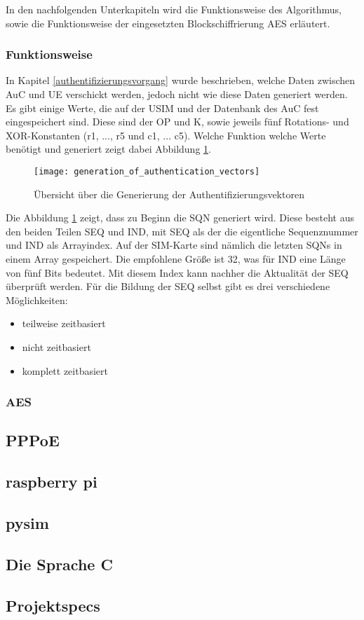 In den nachfolgenden Unterkapiteln wird die Funktionsweise des Algorithmus, sowie die Funktionsweise der eingesetzten Blockschiffrierung \ac{AES} erläutert.

 \subsubsection{Funktionsweise}
 In Kapitel \ref{authentifizierungsvorgang} wurde beschrieben, welche Daten zwischen \ac{AuC} und \ac{UE} verschickt werden, jedoch nicht wie diese Daten generiert werden. Es gibt einige Werte, die auf der \ac{USIM} und der Datenbank des \ac{AuC} fest eingespeichert sind. Diese sind der \ac{OP} und \ac{K}, sowie jeweils fünf Rotations- und XOR-Konstanten (r1, ..., r5 und c1, ... c5). Welche Funktion welche Werte benötigt und generiert zeigt dabei Abbildung \ref{abb:funktionsubersicht}.
 
 \begin{figure}[htp]
  \begin{center}
   \texttt{[image: generation\_of\_authentication\_vectors]}
  \end{center}
  \caption{Übersicht über die Generierung der Authentifizierungsvektoren}
  \label{abb:funktionsubersicht}
 \end{figure}
 
 Die Abbildung \ref{abb:funktionsubersicht} zeigt, dass zu Beginn die \ac{SQN} generiert wird. Diese besteht aus den beiden Teilen SEQ und IND, mit SEQ als der die eigentliche Sequenznummer und IND als Arrayindex. Auf der SIM-Karte sind nämlich die letzten SQNs in einem Array gespeichert. Die empfohlene Größe ist 32, was für IND eine Länge von fünf Bits bedeutet. Mit diesem Index kann nachher die Aktualität der SEQ überprüft werden. Für die Bildung der SEQ selbst gibt es drei verschiedene Möglichkeiten:
 \begin{itemize}
  \item teilweise zeitbasiert
  \item nicht zeitbasiert
  \item komplett zeitbasiert
 \end{itemize}
 
 \subsubsection{AES}

\subsection{PPPoE}

\subsection{raspberry pi}

\subsection{pysim}

\subsection{Die Sprache C}

\subsection{Projektspecs}
